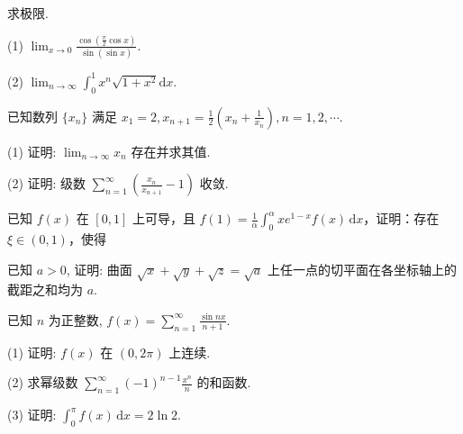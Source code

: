 求极限.\par
(1) $\lim_{x\to 0}\frac{\cos\left(\frac{\pi}{2}\cos x\right)}{\sin(\sin x)}.$\par
(2) $\lim_{n\to \infty}\int_0^1 x^n\sqrt{1 + x^2}\mathrm{d}x.$\par
已知数列 $\{x_{n}\}$ 满足 $x_{1} = 2, x_{n+1} = \frac{1}{2}\left(x_{n} + \frac{1}{x_{n}}\right), n = 1, 2, \cdots$.\par
(1) 证明: $\lim_{n\to \infty}x_n$ 存在并求其值.\par
(2) 证明: 级数 $\sum_{n=1}^{\infty}\left(\frac{x_n}{x_{n+1}} - 1\right)$ 收敛.\par
\par{}
已知 $f(x)$ 在 $[0,1]$ 上可导，且 $f(1) = \frac{1}{\alpha} \int_{0}^{\alpha} xe^{1 - x} f(x) \, \mathrm{d}x$，证明：存在 $\xi \in (0,1)$，使得\par
\nopagebreak[4]
已知 $a > 0$, 证明: 曲面 $\sqrt{x} + \sqrt{y} + \sqrt{z} = \sqrt{a}$ 上任一点的切平面在各坐标轴上的截距之和均为 $a$.\par
已知 $n$ 为正整数, $f(x) = \sum_{n=1}^{\infty} \frac{\sin nx}{n+1}$.\par
(1) 证明: $f(x)$ 在 $(0,2\pi)$ 上连续.\par
(2) 求幂级数 $\sum_{n=1}^{\infty} (-1)^{n-1} \frac{x^n}{n}$ 的和函数.\par
(3) 证明: $\int_{0}^{\pi} f(x) \, \mathrm{d}x = 2 \ln 2$.\par
\par{}
